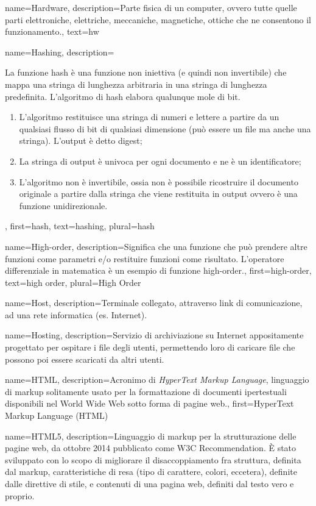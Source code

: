 {
name={Hardware},
description={Parte fisica di un computer, ovvero tutte quelle parti elettroniche, elettriche, meccaniche, magnetiche, ottiche che ne consentono il funzionamento.},
text={hw}
}

{
name={Hashing},
description={La funzione hash è una funzione non iniettiva (e quindi non invertibile) che mappa una stringa di lunghezza arbitraria in una stringa di lunghezza predefinita. L'algoritmo di hash elabora qualunque mole di bit.
 \begin{enumerate}
\item L'algoritmo restituisce una stringa di numeri e lettere a partire da un qualsiasi flusso di bit di qualsiasi dimensione (può essere un file ma anche una stringa). L'output è detto digest;
\item La stringa di output è univoca per ogni documento e ne è un identificatore;
\item L'algoritmo non è invertibile, ossia non è possibile ricostruire il documento originale a partire dalla stringa che viene restituita in output ovvero è una funzione unidirezionale.
 \end{enumerate}},
first={hash},
text={hashing},
plural={hash}
}

{
name={High-order},
description={Significa che una funzione che può prendere altre funzioni come parametri e/o restituire funzioni come risultato. L'operatore differenziale in matematica è un esempio di funzione high-order.},
first={high-order},
text={high order},
plural={High Order}
}

{
name={Host},
description={Terminale collegato, attraverso link di comunicazione, ad una rete informatica (es. Internet).}
}

{
name={Hosting},
description={Servizio di archiviazione su Internet appositamente progettato per ospitare i file degli utenti, permettendo loro di caricare file che possono poi essere scaricati da altri utenti.}
}

{
name={HTML},
description={Acronimo di \textit{HyperText Markup Language}, linguaggio di markup solitamente usato per la formattazione di documenti ipertestuali disponibili nel World Wide Web sotto forma di pagine web.},
first={HyperText Markup Language (HTML)}
}

{
name={HTML5},
description={Linguaggio di markup per la strutturazione delle pagine web, da ottobre 2014 pubblicato come W3C Recommendation. \`{E} stato sviluppato con lo scopo di migliorare il disaccoppiamento fra struttura, definita dal markup, caratteristiche di resa (tipo di carattere, colori, eccetera), definite dalle direttive di stile, e contenuti di una pagina web, definiti dal testo vero e proprio.}
}

